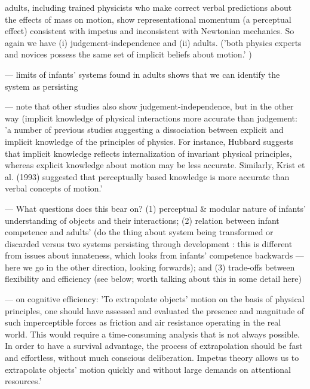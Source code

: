 \documentclass[12pt,\papersize]{extarticle}
\begin{document}
adults, including trained physicists who make correct verbal predictions about the effects of mass on motion, show representational momentum (a perceptual effect) consistent with impetus and inconsistent with Newtonian mechanics.  So again we have (i) judgement-independence and (ii) adults.  ('both physics experts and novices possess the same set of implicit beliefs about motion.' \citep[p.\ 451]{kozhevnikov:2001_impetus})
 
--- limits of infants' systems found in adults shows that we can identify the system as persisting
 
--- note that other studies also show judgement-independence, but in the other way (implicit knowledge of physical interactions more accurate than judgement: 'a number of previous studies suggesting a dissociation between explicit and implicit knowledge of the principles of physics. For instance, Hubbard suggests that implicit knowledge reflects internalization of invariant physical principles, whereas explicit knowledge about motion may be less accurate. Similarly, Krist et al. (1993) suggested that perceptually based knowledge is more accurate than verbal concepts of motion.' \citep[p.\ 450]{kozhevnikov:2001_impetus}
 
--- What questions does this bear on?  (1) perceptual \& modular nature of infants' understanding of objects and their interactions; (2) relation between infant competence and adults' (do the thing about system being transformed or discarded versus two systems persisting through development : this is different from issues about innateness, which looks from infants' competence backwards --- here we go in the other direction, looking forwards); and (3) trade-offs between flexibility and efficiency (see below; worth talking about this in some detail here)
 
--- on cognitive efficiency:  	'To extrapolate objects’ motion on the basis of physical principles, one should have assessed and evaluated the presence and magnitude of such imperceptible forces as friction and air resistance operating in the real world.  This would require a time-consuming analysis that is not always possible. In order to have a survival advantage, the process of extrapolation should be fast and effortless, without much conscious deliberation. Impetus theory allows us to extrapolate objects’ motion quickly and without large demands on attentional resources.' \citep[p.\ 450]{kozhevnikov:2001_impetus}
 
\end{document}
